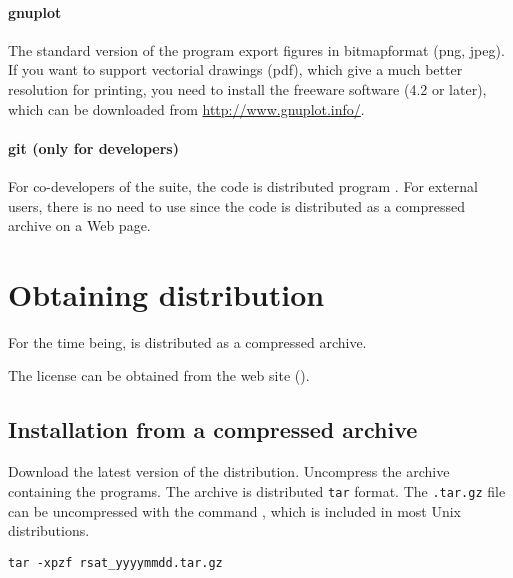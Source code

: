 \documentclass[12pt,a4paper, oneside]{scrreprt} %
\begin{document}
\subsubsection{gnuplot}

The standard version of the \RSAT program  export
figures in bitmapformat (png, jpeg). If you want to support vectorial
drawings (pdf), which give a much better resolution for printing, you
need to install the freeware software  (4.2 or
later), which can be downloaded from \url{http://www.gnuplot.info/}.


\subsubsection{git (only for developers)}

For co-developers of the \RSAT suite, the code is distributed program
. For external users, there is no need to use
 since the code is distributed as a compressed archive on
a Web page.


\chapter{Obtaining \RSAT distribution}

For the time being, \RSAT is distributed as a compressed archive. 

The license can be obtained from the \RSAT web site (\rsaturl).

\section{Installation from a compressed archive}

Download the latest version of the \RSAT distribution. Uncompress the
archive containing the programs. The archive is distributed
\texttt{tar} format. The \texttt{.tar.gz} file can be uncompressed
with the command , which is included in most Unix
distributions.

\begin{lstlisting}
tar -xpzf rsat_yyyymmdd.tar.gz
\end{lstlisting}

\end{document}
